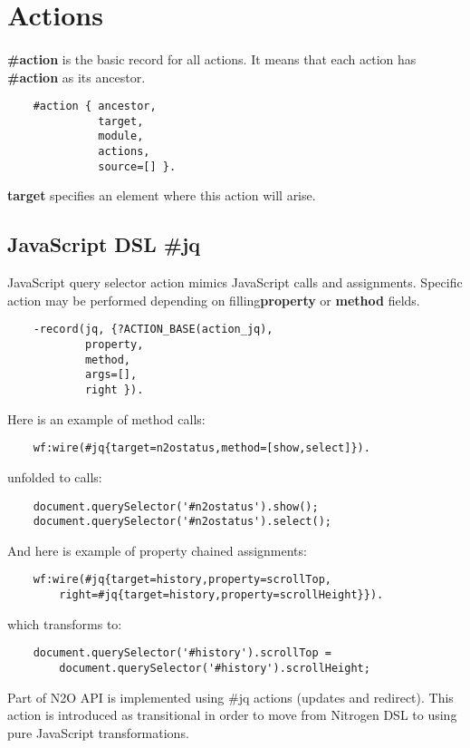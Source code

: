 \section{Actions}

\paragraph{}
{\bf \#action} is the basic record for all actions. It means that each action
has {\bf \#action} as its ancestor.

\vspace{1\baselineskip}
\begin{lstlisting}
    #action { ancestor,
              target,
              module,
              actions,
              source=[] }.
\end{lstlisting}
\vspace{1\baselineskip}

{\bf target} specifies an element where this action will arise.

\subsection{JavaScript DSL {\bf \#jq}}
JavaScript query selector action mimics JavaScript calls and assignments.
Specific action may be performed depending on filling{\bf property} or {\bf method} fields.

\vspace{1\baselineskip}
\begin{lstlisting}
    -record(jq, {?ACTION_BASE(action_jq),
            property,
            method,
            args=[],
            right }).
\end{lstlisting}
\vspace{1\baselineskip}

Here is an example of method calls:
\begin{lstlisting}
    wf:wire(#jq{target=n2ostatus,method=[show,select]}).
\end{lstlisting}
unfolded to calls:
\begin{lstlisting}
    document.querySelector('#n2ostatus').show();
    document.querySelector('#n2ostatus').select();
\end{lstlisting}
\vspace{1\baselineskip}

And here is example of property chained assignments:
\begin{lstlisting}
    wf:wire(#jq{target=history,property=scrollTop,
        right=#jq{target=history,property=scrollHeight}}).
\end{lstlisting}
which transforms to:
\begin{lstlisting}
    document.querySelector('#history').scrollTop =
        document.querySelector('#history').scrollHeight;
\end{lstlisting}
\vspace{1\baselineskip}
Part of N2O API is implemented using \#jq actions (updates and redirect).
This action is introduced as transitional in order to move
from Nitrogen DSL to using pure JavaScript transformations.

